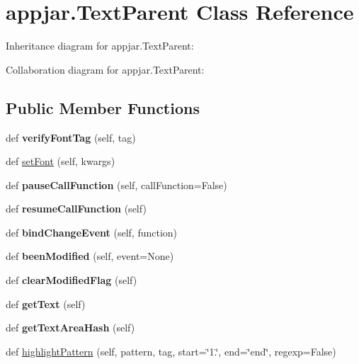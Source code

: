 \hypertarget{classappjar_1_1_text_parent}{}\section{appjar.\+Text\+Parent Class Reference}
\label{classappjar_1_1_text_parent}


Inheritance diagram for appjar.\+Text\+Parent\+:


Collaboration diagram for appjar.\+Text\+Parent\+:
\subsection*{Public Member Functions}
\begin{DoxyCompactItemize}
\item 
\mbox{\label{classappjar_1_1_text_parent_a89c3a6a4b49178d17b2dd33462098fcb}} 
def {\bfseries verify\+Font\+Tag} (self, tag)
\item 
def \hyperlink{classappjar_1_1_text_parent_a1ea57f4cfec1f327e149849d7ac62630}{set\+Font} (self, kwargs)
\item 
\mbox{\label{classappjar_1_1_text_parent_aacab92c12cd7b48d48578c001dd5051c}} 
def {\bfseries pause\+Call\+Function} (self, call\+Function=False)
\item 
\mbox{\label{classappjar_1_1_text_parent_a5d542fd449eabebe65766da47624e1ce}} 
def {\bfseries resume\+Call\+Function} (self)
\item 
\mbox{\label{classappjar_1_1_text_parent_a53b892af5f145f7a3c83b8987d5b6d10}} 
def {\bfseries bind\+Change\+Event} (self, function)
\item 
\mbox{\label{classappjar_1_1_text_parent_a726e48a84d6f96119ada309badcd9cd6}} 
def {\bfseries been\+Modified} (self, event=None)
\item 
\mbox{\label{classappjar_1_1_text_parent_acd1421fa91b4257aca40300821503db6}} 
def {\bfseries clear\+Modified\+Flag} (self)
\item 
\mbox{\label{classappjar_1_1_text_parent_aaa89a6e515c1765e574b42eba82d8388}} 
def {\bfseries get\+Text} (self)
\item 
\mbox{\label{classappjar_1_1_text_parent_a62fb64d30e123db651012bf65337ae2f}} 
def {\bfseries get\+Text\+Area\+Hash} (self)
\item 
def \hyperlink{classappjar_1_1_text_parent_a5ec475a483e2783b731cf31c6833047b}{highlight\+Pattern} (self, pattern, tag, start=\char`\"{}1.\char`\"{}, end=\char`\"{}end\char`\"{}, regexp=False)
\end{DoxyCompactItemize}
